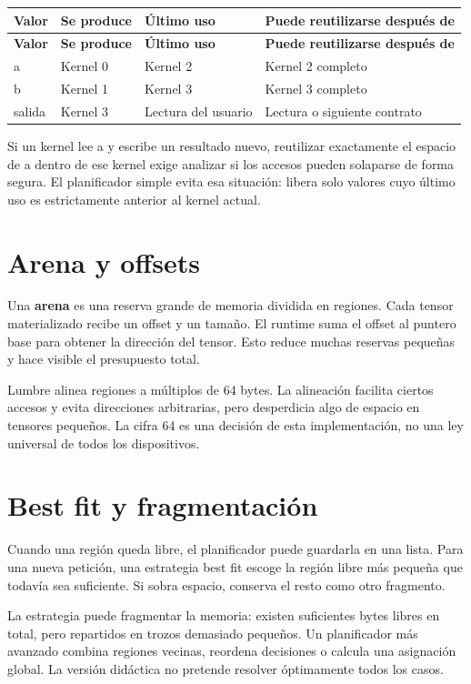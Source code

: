\documentclass[12pt,a4paper,oneside]{report}
\begin{document}
{\small
\begin{longtable}{@{}P{0.22\textwidth}P{0.23\textwidth}P{0.23\textwidth}P{0.23\textwidth}@{}}
\toprule
\textbf{Valor} & \textbf{Se produce} & \textbf{Último uso} & \textbf{Puede reutilizarse después de}\\
\midrule
\endfirsthead
\toprule
\textbf{Valor} & \textbf{Se produce} & \textbf{Último uso} & \textbf{Puede reutilizarse después de}\\
\midrule
\endhead
a & Kernel 0 & Kernel 2 & Kernel 2 completo\\
b & Kernel 1 & Kernel 3 & Kernel 3 completo\\
salida & Kernel 3 & Lectura del usuario & Lectura o siguiente contrato\\
\bottomrule
\end{longtable}
}
Si un kernel lee a y escribe un resultado nuevo, reutilizar exactamente el espacio de a dentro de ese kernel exige analizar si los accesos pueden solaparse de forma segura. El planificador simple evita esa situación: libera solo valores cuyo último uso es estrictamente anterior al kernel actual.

\section{Arena y offsets}
Una \textbf{arena} es una reserva grande de memoria dividida en regiones. Cada tensor materializado recibe un offset y un tamaño. El runtime suma el offset al puntero base para obtener la dirección del tensor. Esto reduce muchas reservas pequeñas y hace visible el presupuesto total.

Lumbre alinea regiones a múltiplos de 64 bytes. La alineación facilita ciertos accesos y evita direcciones arbitrarias, pero desperdicia algo de espacio en tensores pequeños. La cifra 64 es una decisión de esta implementación, no una ley universal de todos los dispositivos.

\section{Best fit y fragmentación}
Cuando una región queda libre, el planificador puede guardarla en una lista. Para una nueva petición, una estrategia best fit escoge la región libre más pequeña que todavía sea suficiente. Si sobra espacio, conserva el resto como otro fragmento.

La estrategia puede fragmentar la memoria: existen suficientes bytes libres en total, pero repartidos en trozos demasiado pequeños. Un planificador más avanzado combina regiones vecinas, reordena decisiones o calcula una asignación global. La versión didáctica no pretende resolver óptimamente todos los casos.
\end{document}
